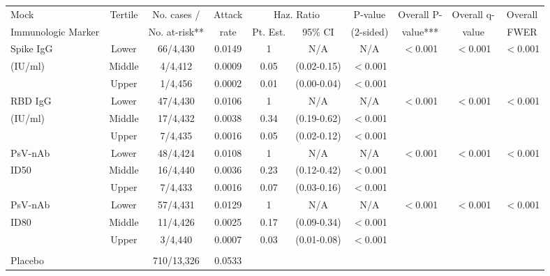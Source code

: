 \begin{tabular}{lccccccccc}
   \hline
 
         \multicolumn{1}{l}{Mock} & \multicolumn{1}{c}{Tertile}   & \multicolumn{1}{c}{No. cases /}   & \multicolumn{1}{c}{Attack}   & \multicolumn{2}{c}{Haz. Ratio}                     & \multicolumn{1}{c}{P-value}   & \multicolumn{1}{c}{Overall P-}      & \multicolumn{1}{c}{Overall q-}   & \multicolumn{1}{c}{Overall} \\ 
         \multicolumn{1}{l}{Immunologic Marker}            & \multicolumn{1}{c}{}          & \multicolumn{1}{c}{No. at-risk**} & \multicolumn{1}{c}{rate}   & \multicolumn{1}{c}{Pt. Est.} & \multicolumn{1}{c}{95\% CI} & \multicolumn{1}{c}{(2-sided)} & \multicolumn{1}{c}{value***} & \multicolumn{1}{c}{value} & \multicolumn{1}{c}{FWER} \\ 
         \hline
 
    Spike IgG & Lower & 66/4,430 & 0.0149 & 1 & N/A & N/A & $<$0.001 & $<$0.001 & $<$0.001 \\ 
  (IU/ml) & Middle & 4/4,412 & 0.0009 & 0.05 & (0.02-0.15) & $<$0.001 &     &     &     \\ 
   & Upper & 1/4,456 & 0.0002 & 0.01 & (0.00-0.04) & $<$0.001 &     &     &     \\ 
  RBD IgG & Lower & 47/4,430 & 0.0106 & 1 & N/A & N/A & $<$0.001 & $<$0.001 & $<$0.001 \\ 
  (IU/ml) & Middle & 17/4,432 & 0.0038 & 0.34 & (0.19-0.62) & $<$0.001 &     &     &     \\ 
   & Upper & 7/4,435 & 0.0016 & 0.05 & (0.02-0.12) & $<$0.001 &     &     &     \\ 
  PsV-nAb & Lower & 48/4,424 & 0.0108 & 1 & N/A & N/A & $<$0.001 & $<$0.001 & $<$0.001 \\ 
  ID50 & Middle & 16/4,440 & 0.0036 & 0.23 & (0.12-0.42) & $<$0.001 &     &     &     \\ 
   & Upper & 7/4,433 & 0.0016 & 0.07 & (0.03-0.16) & $<$0.001 &     &     &     \\ 
  PsV-nAb & Lower & 57/4,431 & 0.0129 & 1 & N/A & N/A & $<$0.001 & $<$0.001 & $<$0.001 \\ 
  ID80 & Middle & 11/4,426 & 0.0025 & 0.17 & (0.09-0.34) & $<$0.001 &     &     &     \\ 
   & Upper & 3/4,440 & 0.0007 & 0.03 & (0.01-0.08) & $<$0.001 &     &     &     \\ 
    
 \multicolumn{8}{l}{} \\ 

 \multicolumn{2}{l}{Placebo} & 710/13,326&0.0533&\multicolumn{4}{l}{}  \\ 
 \hline
\end{tabular}
